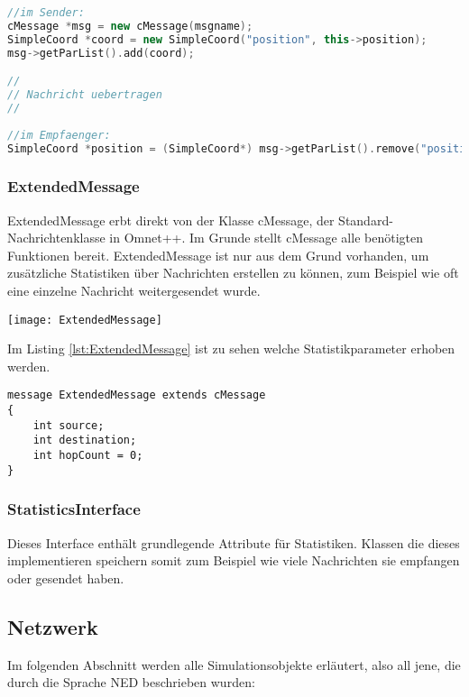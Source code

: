 \begin{lstlisting}[language=C++, label=lst:SimpleExample]
//im Sender:
cMessage *msg = new cMessage(msgname);
SimpleCoord *coord = new SimpleCoord("position", this->position);
msg->getParList().add(coord);

//
// Nachricht uebertragen    
//  
  
//im Empfaenger:  
SimpleCoord *position = (SimpleCoord*) msg->getParList().remove("position");
\end{lstlisting}

\subsubsection{ExtendedMessage}

ExtendedMessage erbt direkt von der Klasse cMessage, der Standard-Nachrichtenklasse in Omnet++. Im Grunde stellt cMessage alle benötigten Funktionen bereit. ExtendedMessage ist nur aus dem Grund vorhanden, um zusätzliche Statistiken über Nachrichten erstellen zu können, zum Beispiel wie oft eine einzelne Nachricht weitergesendet wurde.

\begin{center}
\texttt{[image: ExtendedMessage]}
\end{center}

Im Listing \ref{lst:ExtendedMessage} ist zu sehen welche Statistikparameter erhoben werden.

\begin{lstlisting}[language=NED, label=lst:ExtendedMessage]
message ExtendedMessage extends cMessage
{
	int source;
    int destination;
    int hopCount = 0;    
}
\end{lstlisting}

\subsubsection{StatisticsInterface}

Dieses Interface enthält grundlegende Attribute für Statistiken. Klassen die dieses implementieren speichern somit zum Beispiel wie viele Nachrichten sie empfangen oder gesendet haben.

\subsection{Netzwerk}

Im folgenden Abschnitt werden alle Simulationsobjekte erläutert, also all jene, die durch die Sprache NED beschrieben wurden:

